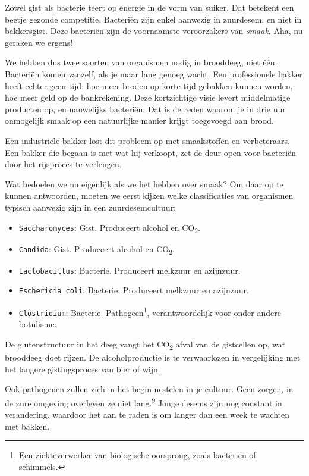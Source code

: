 \documentclass[
  11pt,
  dutch,
]{memoir}
\providecommand{\tightlist}{%
  \setlength{\itemsep}{0pt}\setlength{\parskip}{0pt}}
\begin{document}
Zowel gist als bacterie teert op energie in de vorm van suiker. Dat
betekent een beetje gezonde competitie. Bacteriën zijn enkel aanwezig in
zuurdesem, en niet in bakkersgist. Deze bacteriën zijn de voornaamste
veroorzakers van \emph{smaak}. Aha, nu geraken we ergens!

We hebben dus twee soorten van organismen nodig in brooddeeg, niet één.
Bacteriën komen vanzelf, als je maar lang genoeg wacht. Een
professionele bakker heeft echter geen tijd: hoe meer broden op korte
tijd gebakken kunnen worden, hoe meer geld op de bankrekening. Deze
kortzichtige visie levert middelmatige producten op, en nauwelijks
bacteriën. Dat is de reden waarom je in drie uur onmogelijk smaak op een
natuurlijke manier krijgt toegevoegd aan brood.

Een industriële bakker lost dit probleem op met smaakstoffen en
verbeteraars. Een bakker die begaan is met wat hij verkoopt, zet de deur
open voor bacteriën door het rijsproces te verlengen.

Wat bedoelen we nu eigenlijk als we het hebben over smaak? Om daar op te
kunnen antwoorden, moeten we eerst kijken welke classificaties van
organismen typisch aanwezig zijn in een zuurdesemcultuur:

\begin{itemize}
\tightlist
\item
  \texttt{Saccharomyces}: Gist. Produceert alcohol en
  CO\textsubscript{2}.
\item
  \texttt{Candida}: Gist. Produceert alcohol en CO\textsubscript{2}.
\item
  \texttt{Lactobacillus}: Bacterie. Produceert melkzuur en azijnzuur.
\item
  \texttt{Eschericia\ coli}: Bacterie. Produceert melkzuur en azijnzuur.
\item
  \texttt{Clostridium}: Bacterie. Pathogeen\footnote{Een ziekteverwerker
    van biologische oorsprong, zoals bacteriën of schimmels.},
  verantwoordelijk voor onder andere botulisme.
\end{itemize}

De glutenstructuur in het deeg vangt het CO\textsubscript{2} afval van
de gistcellen op, wat brooddeeg doet rijzen. De alcoholproductie is te
verwaarlozen in vergelijking met het langere gistingsproces van bier of
wijn.

Ook pathogenen zullen zich in het begin nestelen in je cultuur. Geen
zorgen, in de zure omgeving overleven ze niet lang.\textsuperscript{9}
Jonge desems zijn nog constant in verandering, waardoor het aan te raden
is om langer dan een week te wachten met bakken.
\end{document}
